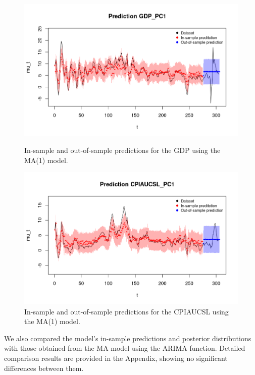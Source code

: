 \begin{figure}[H]
    \centering
    \begin{minipage}{0.49\textwidth}
        \centering
        \includegraphics[width=\textwidth]{images/3-MA/gdp_prediction.png}
        \caption{In-sample and out-of-sample predictions for the GDP using the MA(1) model.}
        \label{fig:MA1_gdp_prediction}
    \end{minipage}\hfill
    \begin{minipage}{0.49\textwidth}
        \centering
        \includegraphics[width=\textwidth]{images/3-MA/infl_prediction.png}
        \caption{In-sample and out-of-sample predictions for the CPIAUCSL using the MA(1) model.}
        \label{fig:MA1_infl_prediction}
    \end{minipage}
\end{figure}
We also compared the model's in-sample predictions and posterior distributions with those obtained from the MA model using the ARIMA function. Detailed comparison results are provided in the Appendix, showing no significant differences between them.
